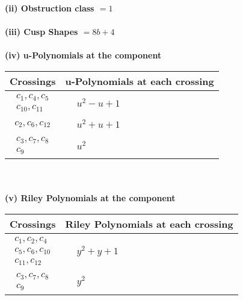 \documentclass[1p]{elsarticle_modified}
\theoremstyle{definition}
\begin{document}
\flushleft \textbf{(ii) Obstruction class $= 1$}\\~\\
\flushleft \textbf{(iii) Cusp Shapes $= 8 b+4$}\\~\\
\newpage\renewcommand{\arraystretch}{1}
\flushleft \textbf{(iv) u-Polynomials at the component}\newline \\
\begin{tabular}{m{50pt}|m{274pt}}
Crossings & \hspace{64pt}u-Polynomials at each crossing \\
\hline $$\begin{aligned}c_{1},c_{4},c_{5}\\c_{10},c_{11}\end{aligned}$$&$\begin{aligned}
&u^2- u+1
\end{aligned}$\\
\hline $$\begin{aligned}c_{2},c_{6},c_{12}\end{aligned}$$&$\begin{aligned}
&u^2+u+1
\end{aligned}$\\
\hline $$\begin{aligned}c_{3},c_{7},c_{8}\\c_{9}\end{aligned}$$&$\begin{aligned}
&u^2
\end{aligned}$\\
\hline
\end{tabular}\\~\\
\newpage\renewcommand{\arraystretch}{1}
\flushleft \textbf{(v) Riley Polynomials at the component}\newline \\
\begin{tabular}{m{50pt}|m{274pt}}
Crossings & \hspace{64pt}Riley Polynomials at each crossing \\
\hline $$\begin{aligned}c_{1},c_{2},c_{4}\\c_{5},c_{6},c_{10}\\c_{11},c_{12}\end{aligned}$$&$\begin{aligned}
&y^2+y+1
\end{aligned}$\\
\hline $$\begin{aligned}c_{3},c_{7},c_{8}\\c_{9}\end{aligned}$$&$\begin{aligned}
&y^2
\end{aligned}$\\
\hline
\end{tabular}\\~\\
\end{document}
